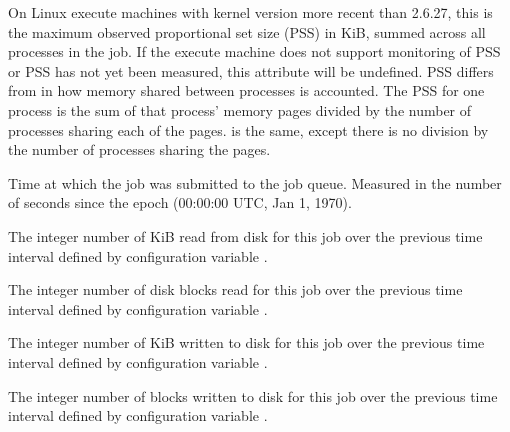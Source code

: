 \begin{description}
\item[\AdAttr{ProportionalSetSizeKb}:]
On Linux execute machines with kernel version more recent than 2.6.27,
this is the maximum observed proportional set size (PSS) in KiB,
summed across all processes in the job.
If the execute machine does not
support monitoring of PSS or PSS has not yet been measured,
this attribute will be undefined.  
PSS differs from  in how memory shared
between processes is accounted.
The PSS for one process is the sum of that process' memory pages 
divided by the number of processes sharing each of the pages.
 is the same,
except there is no division by the number of processes sharing the pages.

\item[\AdAttr{QDate}:]  Time at which the job was submitted to the job
queue.  Measured in the
number of seconds since the epoch (00:00:00 UTC, Jan 1, 1970).

\item[\AdAttr{RecentBlockReadKbytes}:] The integer number of KiB
read from disk for this job over the previous time interval defined
by configuration variable .

\item[\AdAttr{RecentBlockReads}:] The integer number of disk blocks
read for this job over the previous time interval defined
by configuration variable .

\item[\AdAttr{RecentBlockWriteKbytes}:] The integer number of KiB
written to disk for this job over the previous time interval defined
by configuration variable .

\item[\AdAttr{RecentBlockWrites}:] The integer number of blocks
written to disk for this job over the previous time interval defined
by configuration variable .


\end{description}
